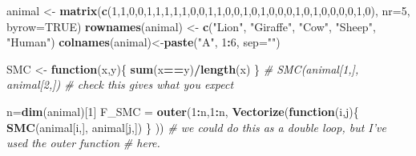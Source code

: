 \documentclass[]{book}
\newenvironment{Shaded}{\begin{snugshade}}{\end{snugshade}}
\newcommand{\CommentTok}[1]{\textcolor[rgb]{0.56,0.35,0.01}{\textit{#1}}}
\newcommand{\ControlFlowTok}[1]{\textcolor[rgb]{0.13,0.29,0.53}{\textbf{#1}}}
\newcommand{\DataTypeTok}[1]{\textcolor[rgb]{0.13,0.29,0.53}{#1}}
\newcommand{\DecValTok}[1]{\textcolor[rgb]{0.00,0.00,0.81}{#1}}
\newcommand{\KeywordTok}[1]{\textcolor[rgb]{0.13,0.29,0.53}{\textbf{#1}}}
\newcommand{\NormalTok}[1]{#1}
\newcommand{\OperatorTok}[1]{\textcolor[rgb]{0.81,0.36,0.00}{\textbf{#1}}}
\newcommand{\OtherTok}[1]{\textcolor[rgb]{0.56,0.35,0.01}{#1}}
\newcommand{\StringTok}[1]{\textcolor[rgb]{0.31,0.60,0.02}{#1}}
\theoremstyle{definition}
\theoremstyle{definition}
\theoremstyle{definition}
\theoremstyle{remark}
\begin{document}
\begin{Shaded}
\begin{Highlighting}[]
\NormalTok{animal <-}\StringTok{ }\KeywordTok{matrix}\NormalTok{(}\KeywordTok{c}\NormalTok{(}\DecValTok{1}\NormalTok{,}\DecValTok{1}\NormalTok{,}\DecValTok{0}\NormalTok{,}\DecValTok{0}\NormalTok{,}\DecValTok{1}\NormalTok{,}\DecValTok{1}\NormalTok{,}\DecValTok{1}\NormalTok{,}\DecValTok{1}\NormalTok{,}\DecValTok{1}\NormalTok{,}\DecValTok{0}\NormalTok{,}\DecValTok{0}\NormalTok{,}\DecValTok{1}\NormalTok{,}\DecValTok{1}\NormalTok{,}\DecValTok{0}\NormalTok{,}\DecValTok{0}\NormalTok{,}\DecValTok{1}\NormalTok{,}\DecValTok{0}\NormalTok{,}\DecValTok{1}\NormalTok{,}\DecValTok{0}\NormalTok{,}\DecValTok{0}\NormalTok{,}\DecValTok{0}\NormalTok{,}\DecValTok{1}\NormalTok{,}\DecValTok{0}\NormalTok{,}\DecValTok{1}\NormalTok{,}\DecValTok{0}\NormalTok{,}\DecValTok{0}\NormalTok{,}\DecValTok{0}\NormalTok{,}\DecValTok{0}\NormalTok{,}\DecValTok{1}\NormalTok{,}\DecValTok{0}\NormalTok{), }
                 \DataTypeTok{nr=}\DecValTok{5}\NormalTok{, }\DataTypeTok{byrow=}\OtherTok{TRUE}\NormalTok{)}
\KeywordTok{rownames}\NormalTok{(animal) <-}\StringTok{ }\KeywordTok{c}\NormalTok{(}\StringTok{"Lion"}\NormalTok{, }\StringTok{"Giraffe"}\NormalTok{, }\StringTok{"Cow"}\NormalTok{, }\StringTok{"Sheep"}\NormalTok{, }\StringTok{"Human"}\NormalTok{)}
\KeywordTok{colnames}\NormalTok{(animal)<-}\KeywordTok{paste}\NormalTok{(}\StringTok{"A"}\NormalTok{, }\DecValTok{1}\OperatorTok{:}\DecValTok{6}\NormalTok{, }\DataTypeTok{sep=}\StringTok{""}\NormalTok{)}

\NormalTok{SMC <-}\StringTok{ }\ControlFlowTok{function}\NormalTok{(x,y)\{}
  \KeywordTok{sum}\NormalTok{(x}\OperatorTok{==}\NormalTok{y)}\OperatorTok{/}\KeywordTok{length}\NormalTok{(x)}
\NormalTok{\}}
\CommentTok{# SMC(animal[1,], animal[2,]) # check this gives what you expect}

\NormalTok{n=}\KeywordTok{dim}\NormalTok{(animal)[}\DecValTok{1}\NormalTok{]}
\NormalTok{F_SMC =}\StringTok{ }\KeywordTok{outer}\NormalTok{(}\DecValTok{1}\OperatorTok{:}\NormalTok{n,}\DecValTok{1}\OperatorTok{:}\NormalTok{n,}
              \KeywordTok{Vectorize}\NormalTok{(}\ControlFlowTok{function}\NormalTok{(i,j)\{}
                \KeywordTok{SMC}\NormalTok{(animal[i,], animal[j,])}
\NormalTok{                \}}
\NormalTok{                ))}
\CommentTok{# we could do this as a double loop, but I've used the outer function}
\CommentTok{# here.}
\end{Highlighting}
\end{Shaded}
\end{document}
